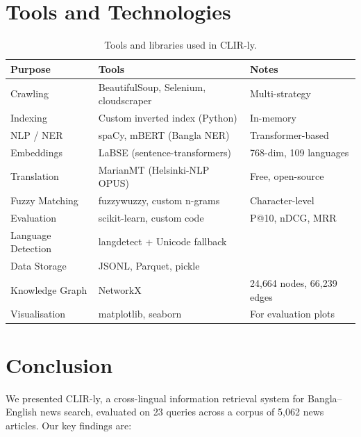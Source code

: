 \documentclass[12pt,a4paper]{article}
\begin{document}
\section{Tools and Technologies}

\begin{table}[H]
\centering
\caption{Tools and libraries used in CLIR-ly.}
\label{tab:tools}
\begin{tabular}{lll}
\toprule
\textbf{Purpose} & \textbf{Tools} & \textbf{Notes} \\
\midrule
Crawling           & BeautifulSoup, Selenium, cloudscraper & Multi-strategy \\
Indexing           & Custom inverted index (Python)        & In-memory \\
NLP / NER          & spaCy, mBERT (Bangla NER)             & Transformer-based \\
Embeddings         & LaBSE (sentence-transformers)         & 768-dim, 109 languages \\
Translation        & MarianMT (Helsinki-NLP OPUS)          & Free, open-source \\
Fuzzy Matching     & fuzzywuzzy, custom n-grams            & Character-level \\
Evaluation         & scikit-learn, custom code             & P@10, nDCG, MRR \\
Language Detection & langdetect + Unicode fallback         & \\
Data Storage       & JSONL, Parquet, pickle                & \\
Knowledge Graph    & NetworkX                              & 24{,}664 nodes, 66{,}239 edges \\
Visualisation      & matplotlib, seaborn                   & For evaluation plots \\
\bottomrule
\end{tabular}
\end{table}


\section{Conclusion}

We presented CLIR-ly, a cross-lingual information retrieval system for Bangla--English news search, evaluated on 23 queries across a corpus of 5{,}062 news articles. Our key findings are:
\end{document}
